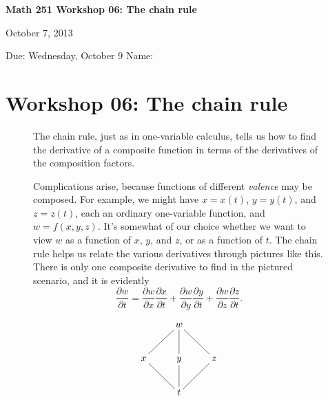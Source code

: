 \documentclass[12pt]{exam}
\theoremstyle{definition}
\begin{document}
\lstset{language=R}
\noindent
\textbf{{\large Math 251 \hfill Workshop 06: The chain rule}}

\noindent
October 7, 2013 

\noindent
Due: Wednesday, October 9 \hfill Name: \underline{\hspace{3in}} 

\noindent

\section{Workshop 06: The chain rule}

\begin{figure}[ht]
\begin{minipage}[t]{0.7\linewidth}
The chain rule, just as in one-variable calculus, tells us how to find the derivative of a composite function in terms of the derivatives of the composition factors.

Complications arise, because functions of different \emph{valence} may be composed. For example, we might have $x = x(t)$, $y = y(t)$, and $z = z(t)$, each an ordinary one-variable function, and $w = f(x,y,z)$. It's somewhat of our choice whether we want to view $w$ as a function of $x$, $y$, and $z$, or as a function of $t$. The chain rule helps us relate the various derivatives through pictures like this. There is only one composite derivative to find in the pictured scenario, and it is evidently
\begin{equation*}
    \frac{\partial w}{\partial t} = \frac{\partial w}{\partial x} \frac{\partial x}{\partial t} + \frac{\partial w}{\partial y} \frac{\partial y}{\partial t} + \frac{\partial w}{\partial z} \frac{\partial z}{\partial t}.    
\end{equation*} 
\end{minipage} \hspace*{1cm}
\begin{minipage}[t]{0.25\linewidth}
    \begin{equation*}
        \xymatrix{
              & w \ar@{-}[dl] \ar@{-}[d] \ar@{-}[dr] & \\
            x \ar@{-}[dr] & y \ar@{-}[d] & z \ar@{-}[dl] \\
            & t & 
        }
    \end{equation*}
\end{minipage}
\end{figure}
\end{document}
